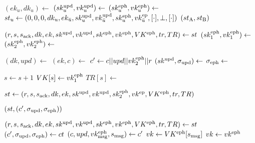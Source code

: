 \algrenewcommand\textproc{}
\algrenewcommand{}
\begin{minipage}{\linewidth}
  {\fontsize{10}{12}\selectfont
  \begin{algorithmic}[1]
      \State $(ek_u,dk_u) \gets$ 
      \State $(sk_u^\text{upd},vk_u^\text{upd}) \gets$ 
      \State $(sk_u^\text{eph},vk_u^\text{eph}) \gets$ 
    \EndFor
    \State $st_u \gets (0,0,0,dk_u,ek_{\bar{u}},sk_u^\text{upd},vk_{\bar{u}}^\text{upd},
                        sk_u^\text{eph},vk_{\bar{u}}^\text{ep},[\cdot],\perp,[\cdot])$
    \EndFor
    \State \Return $(st_\text{A},st_\text{B})$
    \EndProcedure
   \end{algorithmic}
    
   \vspace{10pt}
    
  \begin{algorithmic}[1]
    \State $(r,s,s_\text{ack},dk,ek,sk^\text{upd},vk^\text{upd},
                        sk^\text{eph},vk^\text{eph},VK^\text{eph},tr,TR) \gets st$
    \State $(sk_1^\text{eph},vk_1^\text{eph}) \gets$ 
    \State $(sk_2^\text{eph},vk_2^\text{eph}) \gets$ 

    \State $(dk,upd) \gets$ 
    \State $(ek,c) \gets$ 
    \State $c' \gets c||upd||vk_2^\text{eph}||r$
    \State $(sk^\text{upd},\sigma_\text{upd}) \gets$ 
    \State $\sigma_\text{eph} \gets$ 

    \State $s \gets s+1$
    \State $VK[s] \gets vk_1^\text{eph}$
    \State $TR[s] \gets$ 
    
    
    \State $st \gets (r,s,s_\text{ack},dk,ek,sk^\text{upd},vk^\text{upd},
                        sk_2^\text{eph},vk^\text{ep},VK^\text{eph},tr,TR)$
    
    \State \Return $(st, (c',\sigma_\text{upd},\sigma_\text{eph}))$
    \EndProcedure
   \end{algorithmic}

   \vspace{10pt}
    
  \begin{algorithmic}[1]
    \State $(r,s,s_\text{ack},dk,ek,sk^\text{upd},vk^\text{upd},
                        sk^\text{eph},vk^\text{eph},VK^\text{eph},tr,TR) \gets st$
    \State $(c',\sigma_\text{upd},\sigma_\text{eph}) \gets ct$
    \State $(c,upd,vk_\text{msg}^\text{eph},s_\text{msg}) \gets c'$
    \State $vk \gets VK^\text{eph}[s_\text{msg}]$
    \Else
    \State $vk \gets vk^\text{eph}$
    \EndIf


\end{algorithmic}}
\end{minipage}
